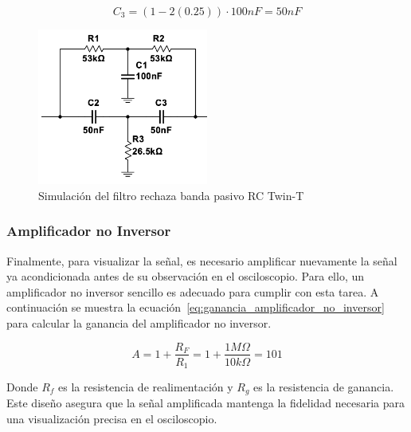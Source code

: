         \begin{equation}
            C_3 = (1 - 2(0.25)) \cdot 100 nF = 50 nF
        \end{equation}

        \begin{figure}[H]
            \centering
            \includegraphics[width=0.5\textwidth]{img/Desarrollo/multisim_rechazaBandas.png}
            \caption[Simulación del filtro rechaza banda pasivo RC Twin-T.]{Simulación del filtro rechaza banda pasivo RC Twin-T\footnotemark}
            \label{fig:Simulacion_Filtro_Rechaza_Banda}
        \end{figure}

        \subsubsection{Amplificador no Inversor}
        Finalmente, para visualizar la señal, es necesario amplificar nuevamente la señal ya acondicionada antes de su observación en el osciloscopio. Para ello, un amplificador no inversor sencillo es adecuado para cumplir con esta tarea. A continuación se muestra la ecuación~\ref{eq:ganancia_amplificador_no_inversor} para calcular la ganancia del amplificador no inversor.

        \begin{equation}
            \label{eq:ganancia_amplificador_no_inversor}
            A = 1 + \frac{R_F}{R_{1}} = 1 + \frac{1 M\Omega}{10 k\Omega} = 101
        \end{equation}

        Donde $R_f$ es la resistencia de realimentación y $R_g$ es la resistencia de ganancia. Este diseño asegura que la señal amplificada mantenga la fidelidad necesaria para una visualización precisa en el osciloscopio.

